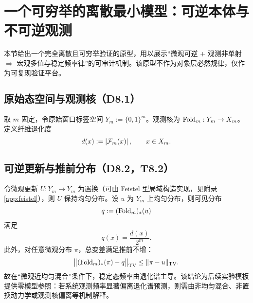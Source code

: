 \section{一个可穷举的离散最小模型：可逆本体与不可逆观测}

本节给出一个完全离散且可穷举验证的原型，用以展示“微观可逆 + 观测非单射 $\Rightarrow$ 宏观多值与稳定频率律”的可审计机制。该原型不作为对象层必然规律，仅作为可复现验证平台。

\subsection{原始态空间与观测核（D8.1）}

取 $m$ 固定，令原始窗口标签空间 $Y_m:=\{0,1\}^m$。观测核为 $\mathrm{Fold}_m:Y_m\to X_m$。定义纤维退化度
\[
d(x):=\left\lvert \mathcal{F}_m(x)\right\rvert,\qquad x\in X_m.
\]

\subsection{可逆更新与推前分布（D8.2，T8.2）}

令微观更新 $U:Y_m\to Y_m$ 为置换（可由 Feistel 型局域构造实现，见附录 \ref{app:feistel}），则 $U$ 保持均匀分布。设 $u$ 为 $Y_m$ 上均匀分布，则可见分布
\[
q:= (\mathrm{Fold}_m)_*(u)
\]
满足
\[
q(x)=\frac{d(x)}{2^m}.
\]
此外，对任意微观分布 $\pi$，总变差满足推前不增：
\[
\big\|(\mathrm{Fold}_m)_*(\pi)-q\big\|_{\mathrm{TV}}
\le \|\pi-u\|_{\mathrm{TV}}.
\]
故在“微观近均匀混合”条件下，稳定态频率由退化谱主导。该结论为后续实验模板提供零模型参照：若系统观测频率显著偏离退化谱预测，则需由非均匀混合、非置换动力学或观测核偏离等机制解释。

